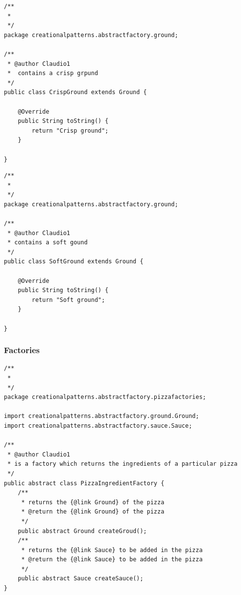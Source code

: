\documentclass{article}
\begin{document}
\begin{lstlisting}
/**
 * 
 */
package creationalpatterns.abstractfactory.ground;

/**
 * @author Claudio1
 *	contains a crisp grpund
 */
public class CrispGround extends Ground {

	@Override
	public String toString() {
		return "Crisp ground";
	}

}
\end{lstlisting}

\begin{lstlisting}
/**
 * 
 */
package creationalpatterns.abstractfactory.ground;

/**
 * @author Claudio1
 * contains a soft gound
 */
public class SoftGround extends Ground {

	@Override
	public String toString() {
		return "Soft ground";
	}

}
\end{lstlisting}

\subsubsection{Factories}
\begin{lstlisting}
/**
 * 
 */
package creationalpatterns.abstractfactory.pizzafactories;

import creationalpatterns.abstractfactory.ground.Ground;
import creationalpatterns.abstractfactory.sauce.Sauce;

/**
 * @author Claudio1
 * is a factory which returns the ingredients of a particular pizza
 */
public abstract class PizzaIngredientFactory {
	/**
	 * returns the {@link Ground} of the pizza
	 * @return the {@link Ground} of the pizza
	 */
	public abstract Ground createGroud();
	/**
	 * returns the {@link Sauce} to be added in the pizza
	 * @return the {@link Sauce} to be added in the pizza
	 */
	public abstract Sauce createSauce();
}
\end{lstlisting}
\end{document}
